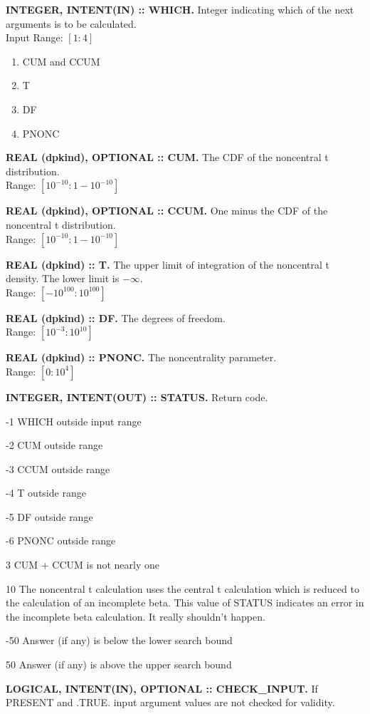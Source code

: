 \documentclass[12pt,dvips]{article}
\newcommand{\range}[2]{\hfill Range: \ensuremath{\left[ #1:#2
\right]}\\}
\newcommand{\inrange}[2]{\hfill Input Range: \ensuremath{\left[ #1:#2
\right]}\\}
\newcommand{\sdf}{10^{-3}}
\newcommand{\bdf}{10^{10}}
\newcommand{\sprob}{10^{-10}}
\newcommand{\bprob}{1-\sprob}
\newcommand{\immense}{10^{100}}
\newcommand{\spnonc}{0}
\newcommand{\bpnonc}{10^4}
\newcommand{\myitem}[1]{\item{\bf \color{Violet} #1 \normalcolor}}
\begin{document}
\begin{description}

\myitem{INTEGER, INTENT(IN)  :: WHICH.} Integer indicating  which of the
next arguments is to be calculated.\\
\inrange{1}{4}
\begin{enumerate}
\item CUM and CCUM
\item T
\item DF
\item PNONC
\end{enumerate}

\myitem{REAL  (dpkind), OPTIONAL ::  CUM.} The  CDF of  the  noncentral t
distribution.\\
\range{\sprob}{\bprob}

\myitem{REAL (dpkind), OPTIONAL :: CCUM.} One minus the CDF of the
noncentral t distribution.\\
\range{\sprob}{\bprob}

\myitem{REAL (dpkind)  :: T.}  The upper  limit of integration  of the
noncentral t
density.     The    lower    limit    is    $-\infty$.\\
\range{-\immense}{\immense}

\myitem{REAL (dpkind) :: DF.}  The degrees of
freedom.\\
\range{\sdf}{\bdf}

\myitem{REAL (dpkind) :: PNONC.}  The noncentrality parameter.\\
\range{\spnonc}{\bpnonc}

\myitem{INTEGER, INTENT(OUT) :: STATUS.} Return code.
\begin{description}
\item{-1}  WHICH outside input range
\item{-2}  CUM outside range
\item{-3}  CCUM outside range
\item{-4}  T outside range
\item{-5}  DF outside range
\item{-6}  PNONC outside range
\item{3} CUM + CCUM is not nearly one
\item{10} The noncentral t calculation uses the central t calculation
which is reduced to the calculation of an incomplete beta.  This value
of STATUS indicates an error in the incomplete beta calculation.  It
really shouldn't happen.
\item{-50} Answer (if any) is below the lower search bound
\item{50} Answer (if any) is above the upper search bound
\end{description}

\myitem{LOGICAL, INTENT(IN), OPTIONAL :: CHECK\_INPUT.}  If PRESENT
and .TRUE. input argument values are not checked for validity.

\end{description}
\end{document}

